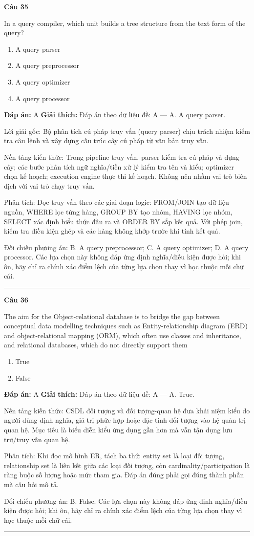 \documentclass[11pt,a4paper]{article}
\newenvironment{question}[1]{%
  \par\vspace{1em}\noindent\textbf{\large Câu #1}\par\vspace{0.4em}
}{%
  \par\vspace{1em}\hrule\vspace{0.6em}
}
\newenvironment{choices}{%
  \begin{enumerate}[label=\textbf{\Alph*.},leftmargin=2.2em,itemsep=2pt,topsep=3pt]
}{%
  \end{enumerate}
}
\newcommand{\choice}{\item}
\begin{document}
\begin{question}{35}
In a query compiler, which unit builds a tree structure from the text form of the query?
\begin{choices}
\choice A query parser
\choice A query preprocessor
\choice A query optimizer
\choice A query processor
\end{choices}
\textbf{Đáp án:} A
\textbf{Giải thích:} Đáp án theo dữ liệu đề: A — A. A query parser.

Lời giải gốc: Bộ phân tích cú pháp truy vấn (query parser) chịu trách nhiệm kiểm tra câu lệnh và xây dựng cấu trúc cây cú pháp từ văn bản truy vấn.

Nền tảng kiến thức: Trong pipeline truy vấn, parser kiểm tra cú pháp và dựng cây; các bước phân tích ngữ nghĩa/tiền xử lý kiểm tra tên và kiểu; optimizer chọn kế hoạch; execution engine thực thi kế hoạch. Không nên nhầm vai trò biên dịch với vai trò chạy truy vấn.

Phân tích: Đọc truy vấn theo các giai đoạn logic: FROM/JOIN tạo dữ liệu nguồn, WHERE lọc từng hàng, GROUP BY tạo nhóm, HAVING lọc nhóm, SELECT xác định biểu thức đầu ra và ORDER BY sắp kết quả. Với phép join, kiểm tra điều kiện ghép và các hàng không khớp trước khi tính kết quả.

Đối chiếu phương án: B. A query preprocessor; C. A query optimizer; D. A query processor. Các lựa chọn này không đáp ứng định nghĩa/điều kiện được hỏi; khi ôn, hãy chỉ ra chính xác điểm lệch của từng lựa chọn thay vì học thuộc mỗi chữ cái.
\end{question}

\begin{question}{36}
The aim for the Object-relational database is to bridge the gap between conceptual data modelling techniques such as Entity-relationship diagram (ERD) and object-relational mapping (ORM), which often use classes and inheritance, and relational databases, which do not directly support them
\begin{choices}
\choice True
\choice False
\end{choices}
\textbf{Đáp án:} A
\textbf{Giải thích:} Đáp án theo dữ liệu đề: A — A. True.

Nền tảng kiến thức: CSDL đối tượng và đối tượng-quan hệ đưa khái niệm kiểu do người dùng định nghĩa, giá trị phức hợp hoặc đặc tính đối tượng vào hệ quản trị quan hệ. Mục tiêu là biểu diễn kiểu ứng dụng gần hơn mà vẫn tận dụng lưu trữ/truy vấn quan hệ.

Phân tích: Khi đọc mô hình ER, tách ba thứ: entity set là loại đối tượng, relationship set là liên kết giữa các loại đối tượng, còn cardinality/participation là ràng buộc số lượng hoặc mức tham gia. Đáp án đúng phải gọi đúng thành phần mà câu hỏi mô tả.

Đối chiếu phương án: B. False. Các lựa chọn này không đáp ứng định nghĩa/điều kiện được hỏi; khi ôn, hãy chỉ ra chính xác điểm lệch của từng lựa chọn thay vì học thuộc mỗi chữ cái.
\end{question}
\end{document}
